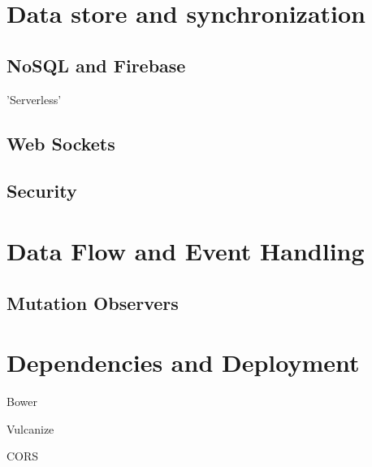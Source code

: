 \section{Data store and synchronization}
\subsection{NoSQL and Firebase}

'Serverless'

\subsection{Web Sockets}

\subsection{Security}

\section{Data Flow and Event Handling}

\subsection{Mutation Observers}

\section{Dependencies and Deployment}

Bower

Vulcanize

CORS

